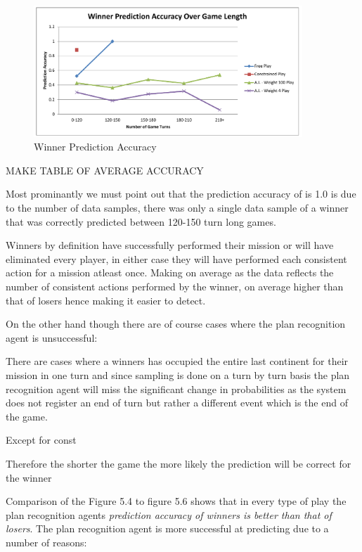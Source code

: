\documentclass[parskip]{cs4rep}
\begin{document}
\begin{figure}[h]
\centerline{
\includegraphics[width=0.9\textwidth]{images/winner-game-length.pdf}
}
\caption{Winner Prediction Accuracy}
\label{fig:dom-debug-gui}
\end{figure} 

MAKE TABLE OF AVERAGE ACCURACY

Most prominantly we must point out that the prediction accuracy of  is 1.0 is due to the number of data samples, there was only a single data sample of a winner that was correctly predicted between 120-150 turn long games.

Winners by definition have successfully performed their mission or will have eliminated every player, in either case they will have performed each consistent action for a mission atleast once. Making on average as the data reflects the number of consistent actions performed by the winner, on average higher than that of losers hence making it easier to detect.

On the other hand though there are of course cases where the plan recognition agent is unsuccessful: 

There are cases where a winners has occupied the entire last continent for their mission in one turn and since sampling is done on a turn by turn basis the plan recognition agent will miss the significant change in probabilities as the system does not register an end of turn but rather a different event which is the end of the game.

Except for const

Therefore the shorter the game the more likely the prediction will be correct for the winner

Comparison of the Figure 5.4 to figure 5.6 shows that in every type of play the plan recognition agents \textit{prediction accuracy of winners is better than that of losers}. The plan recognition agent is more successful at predicting due to a number of reasons:
\end{document}
